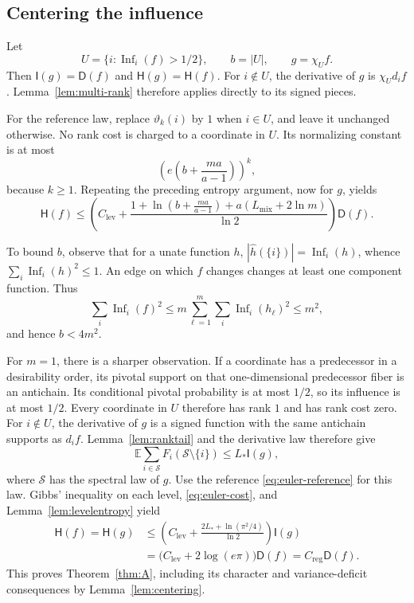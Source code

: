\documentclass[11pt]{amsart}
\theoremstyle{definition}
\theoremstyle{remark}
\newcommand{\E}{\mathbb E}
\newcommand{\HH}{\mathsf H}
\newcommand{\I}{\mathsf I}
\newcommand{\D}{\mathsf D}
\DeclareMathOperator{\Inf}{Inf}
\newcommand{\wh}[1]{\widehat{#1}}
\newcommand{\Lp}{L_*}
\newcommand{\Lmix}{L_{\mathrm{mix}}}
\newcommand{\Clev}{C_{\mathrm{lev}}}
\newcommand{\Creg}{C_{\mathrm{reg}}}
\begin{document}
\subsection{Centering the influence}

Let
\[
 U=\{i:\Inf_i(f)>1/2\},\qquad b=|U|,\qquad g=\chi_U f.
\]
Then $\I(g)=\D(f)$ and $\HH(g)=\HH(f)$.
For $i\notin U$, the derivative of $g$ is $\chi_Ud_i f$.
Lemma~\ref{lem:multi-rank} therefore applies directly to its signed pieces.

For the reference law, replace $\vartheta_k(i)$ by $1$ when $i\in U$, and leave it unchanged otherwise.
No rank cost is charged to a coordinate in $U$.
Its normalizing constant is at most
\[
 \left(e\left(b+\frac{ma}{a-1}\right)\right)^k,
\]
because $k\ge1$.
Repeating the preceding entropy argument, now for $g$, yields
\begin{equation}\label{eq:centerexact}
 \HH(f)\le
 \left(\Clev+\frac{1+\ln\!\left(b+\frac{ma}{a-1}\right)
                    +a(\Lmix+2\ln m)}{\ln2}\right)\D(f).
\end{equation}

To bound $b$, observe that for a unate function $h$,
$|\wh h(\{i\})|=\Inf_i(h)$, whence
$\sum_i\Inf_i(h)^2\le1$.
An edge on which $f$ changes changes at least one component function. Thus
\[
 \sum_i\Inf_i(f)^2
 \le m\sum_{\ell=1}^m\sum_i\Inf_i(h_\ell)^2
 \le m^2,
\]
and hence $b<4m^2$.

For $m=1$, there is a sharper observation.
If a coordinate has a predecessor in a desirability order, its pivotal support on that one-dimensional predecessor fiber is an antichain.
Its conditional pivotal probability is at most $1/2$, so its influence is at most $1/2$.
Every coordinate in $U$ therefore has rank $1$ and has rank cost zero.
For $i\notin U$, the derivative of $g$ is a signed function with the same
antichain supports as $d_i f$.
Lemma~\ref{lem:ranktail} and the derivative law therefore give
\[
 \E\sum_{i\in\mathcal S}F_i(\mathcal S\setminus\{i\})
 \le\Lp\I(g),
\]
where $\mathcal S$ has the spectral law of $g$.
Use the reference \eqref{eq:euler-reference} for this law.
Gibbs' inequality on each level, \eqref{eq:euler-cost}, and
Lemma~\ref{lem:levelentropy} yield
\begin{align*}
 \HH(f)=\HH(g)
 &\le\left(\Clev+\frac{2\Lp+\ln(\pi^2/4)}{\ln2}\right)\I(g)\\
 &=\bigl(\Clev+2\log(e\pi)\bigr)\D(f)=\Creg\D(f).
\end{align*}
This proves Theorem~\ref{thm:A}, including its character and variance-deficit consequences by Lemma~\ref{lem:centering}.
\end{document}
